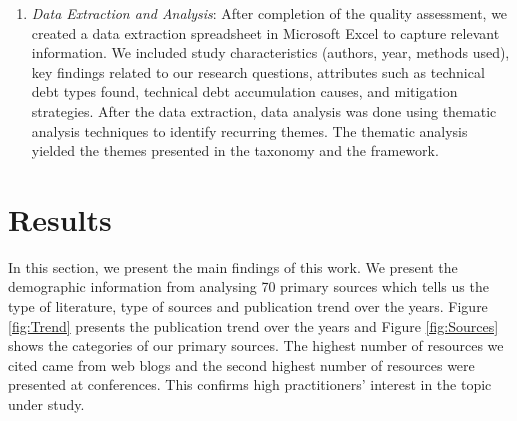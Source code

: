 \begin{enumerate}
\item \emph{Data Extraction and Analysis}:
After completion of the quality assessment, we created a data extraction spreadsheet in Microsoft Excel
to capture relevant information. We included study characteristics (authors, year, methods used), key findings related to our research questions, attributes such as technical debt types found, technical debt accumulation causes, and mitigation strategies. After the data extraction, data analysis was done using
thematic analysis techniques to identify recurring themes. The thematic analysis yielded the themes presented in the taxonomy and the framework.
\end{enumerate}



\section{Results}\label{Sec:Results}
In this section, we present the main findings of this work. We present the demographic information from analysing 70 primary sources which tells us the type of literature, type of sources and publication trend over the years. Figure \ref{fig:Trend} presents the publication trend over the years and Figure \ref{fig:Sources} shows the categories of our primary sources.
The highest number of resources we cited came from web blogs and the second highest number of resources were presented at conferences.
This confirms high practitioners' interest in the topic under study.

